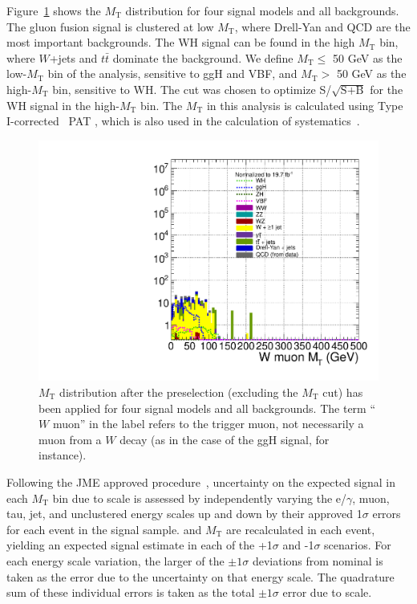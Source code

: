 Figure~\ref{fig:sigVsBkg_MET_MT_regA} shows the $M_{\text{T}}$ distribution for four signal models and all backgrounds.  The gluon fusion signal is clustered at low $M_{\text{T}}$, where Drell-Yan and QCD are the most important backgrounds.  The WH signal can be found in the high $M_{\text{T}}$ bin, where $W$+jets and $t\bar{t}$ dominate the background.  We define $M_{\text{T}} \le$ 50 GeV as the low-$M_{\text{T}}$ bin of the analysis, sensitive to ggH and VBF, and $M_{\text{T}} >$ 50 GeV as the high-$M_{\text{T}}$ bin, sensitive to WH.  The cut was chosen to optimize S/$\sqrt{\text{S} + \text{B}}$ for the WH signal in the high-$M_{\text{T}}$ bin.  The $M_{\text{T}}$ in this analysis is calculated using Type I-corrected~\cite{1748-0221-6-11-P11002} PAT \ETslash, which is also used in the calculation of \ETslash systematics~\cite{METuncertainty}.

\begin{figure}[hbtp]
  \begin{center}
    \includegraphics[width=1.2\cmsFigWidth]{figures/sigVsBkg_MT_regA_v62}
    \caption{$M_{\text{T}}$ distribution after the preselection (excluding the $M_{\text{T}}$ cut) has been applied for four signal models and all backgrounds. The term ``$W$ muon'' in the label refers to the trigger muon, not necessarily a muon from a $W$ decay (as in the case of the ggH signal, for instance).}
    \label{fig:sigVsBkg_MET_MT_regA}
  \end{center}
\end{figure}

Following the JME approved procedure~\cite{METuncertainty}, uncertainty on the expected signal in each $M_{\text{T}}$ bin due to \ETslash scale is assessed by independently varying the e/$\gamma$, muon, tau, jet, and unclustered energy scales up and down by their approved 1$\sigma$ errors for each event in the signal sample.  \ETslash and $M_{\text{T}}$ are recalculated in each event, yielding an expected signal estimate in each of the +1$\sigma$ and -1$\sigma$ scenarios.  For each energy scale variation, the larger of the $\pm1\sigma$ deviations from nominal is taken as the error due to the uncertainty on that energy scale.  The quadrature sum of these individual errors is taken as the total $\pm1\sigma$ error due to \ETslash scale.

